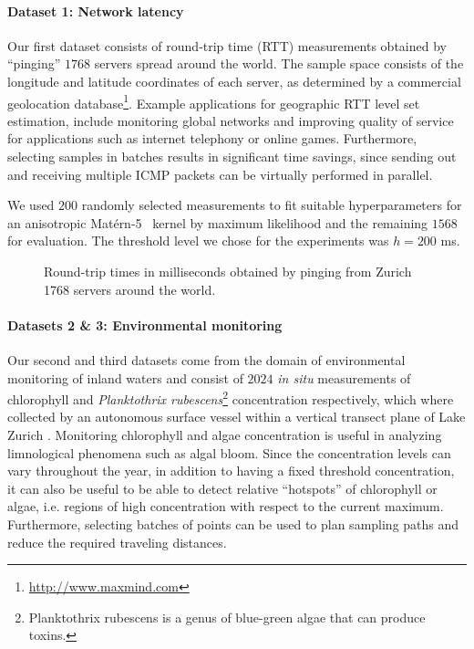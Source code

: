 \paragraph{Dataset 1: Network latency}
Our first dataset consists of round-trip time (RTT) measurements obtained
by ``pinging'' $1768$ servers spread around the world.
The sample space consists of the longitude and latitude coordinates of each
server, as determined by a commercial geolocation
database\footnote{\url{http://www.maxmind.com}}.
Example applications for geographic RTT level set estimation, include
monitoring global networks and improving quality of service for applications
such as internet telephony or online games. Furthermore,
selecting samples in batches results in significant time savings, since
sending out and receiving multiple ICMP packets can be virtually performed in
parallel.

We used $200$ randomly selected measurements to fit suitable hyperparameters for
an anisotropic Mat\'{e}rn-5~\mbox{\cite{rasmussen06}} kernel by maximum
likelihood  and the remaining $1568$ for evaluation.
The threshold level we chose for the experiments was $h = 200$ ms.

%
\begin{figure}[tb]
  \centering
  \caption{Round-trip times in milliseconds obtained by pinging from Zurich
           1768 servers around the world.}
  \label{fig:map}
\end{figure}

\paragraph{Datasets 2 \& 3: Environmental monitoring}
Our second and third datasets come from the domain of environmental monitoring
of inland
waters and consist of $2024$ \emph{in situ} measurements of chlorophyll
and \emph{Planktothrix rubescens}\footnote{Planktothrix rubescens is a genus of
blue-green algae that can produce toxins.}
concentration respectively, which where collected by an autonomous surface
vessel within a vertical transect plane of Lake Zurich \cite{hitz12}.
Monitoring chlorophyll and algae concentration is useful in analyzing
limnological phenomena such as algal bloom. Since the concentration levels can
vary throughout the year, in addition to having a fixed threshold
concentration, it can also be useful to be able to detect
relative ``hotspots'' of chlorophyll or algae, i.e. regions of high
concentration with respect to the current maximum. Furthermore, selecting
batches of points can be used to plan sampling paths and reduce the required
traveling distances.

